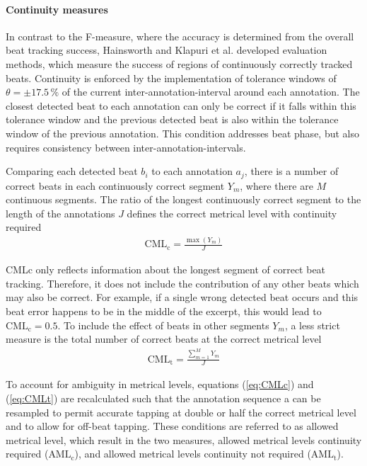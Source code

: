 \documentclass{scrartcl}
\begin{document}
\paragraph{Continuity measures} 
In contrast to the F-measure, where the accuracy is determined from the overall beat tracking success, Hainsworth \cite{Hainsworth2004b} and Klapuri et al. \cite{Klapuri2006} developed evaluation methods, which measure the success of regions of continuously correctly tracked beats. Continuity is enforced by the implementation of tolerance windows of $\theta  = \pm 17.5\, \%$ of the current inter-annotation-interval around each annotation. The closest detected beat to each annotation can only be correct if it falls within this tolerance window and the previous detected beat is also within the tolerance window of the previous annotation. This condition addresses beat phase, but also requires consistency between inter-annotation-intervals. 

Comparing each detected beat $b_i$ to each annotation $a_j$, there is a number of correct beats in each continuously correct segment $Y_m$, where there are $M$ continuous segments. The ratio of the longest continuously correct segment to the length of the annotations $J$ defines the correct metrical level with continuity required
\begin{align}
\label{eq:CMLc}
\text{CML}_\text{c} = \frac{\max(Y_m)}{J}
\end{align} 

CMLc only reflects information about the longest segment of correct beat tracking. Therefore, it does not include the contribution of any other beats which may also be correct. For example, if a single wrong detected beat occurs and this beat error happens to be in the middle of the excerpt, this would lead to $\text{CML}_\text{c} = 0.5$. To include the effect of beats in other segments $Y_m$, a less strict measure is the total number of correct beats at the correct metrical level
\begin{align}
\label{eq:CMLt}
\text{CML}_\text{t} = \frac{\sum_{m=1}^MY_m}{J}
\end{align} 

To account for ambiguity in metrical levels, equations (\ref{eq:CMLc}) and (\ref{eq:CMLt}) are recalculated such that the annotation sequence a can be resampled to permit accurate tapping at double or half the correct metrical level and to allow for off-beat tapping. These conditions are referred to as allowed metrical level, which result in the two measures, allowed metrical levels continuity required ($\text{AML}_\text{c}$), and allowed metrical levels continuity not required ($\text{AML}_\text{t}$). 
\end{document}
